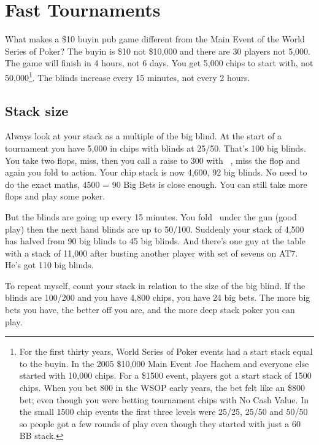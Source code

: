 \chapter{Fast Tournaments}


What makes a \$10 buyin pub game different from the Main Event of
the World Series of Poker? The buyin is \$10 not \$10,000 and there are 30
players not 5,000. The game will finish in 4 hours, not 6 days. You get
5,000 chips to start with, not 50,000\footnote{For the first thirty
years, World Series of Poker events had a start stack equal to the
buyin. In the 2005 \$10,000 Main Event Joe Hachem and everyone else
started with 10,000 chips. For a \$1500 event, players got a start
stack of 1500 chips. When you bet 800 in the WSOP early years, the bet
felt like an \$800 bet; even though you were betting tournament chips
with No Cash Value. In the small 1500 chip events the first three
levels were 25/25, 25/50 and 50/50 so people got a few rounds of play
even though they started with just a 60 BB stack.}. The blinds
increase every 15 minutes, not every 2 hours.

\section{Stack size}

Always look at your stack as a multiple of the big blind.
At the start of a tournament you have 5,000 in chips with blinds
at 25/50. That's 100 big blinds. You take two flops, miss, then you
call a raise to 300 with \sixs\sixc\ , miss the flop and again you
fold to action. Your chip stack is now 4,600, 92 big blinds. No need
to do the exact maths, 4500 = 90 Big Bets is close enough. You can
still take more flops and play some poker.

But the blinds are going up every 15 minutes. You fold \Ah\eigc\ under
the gun (good play) then the next hand blinds are up to 50/100.
Suddenly your stack of 4,500 has halved from 90 big blinds to 45
big blinds. And there's one guy at the table with a stack of 11,000 after
busting another player with set of sevens on AT7. He's got 110 big
blinds.

To repeat myself, count your stack in relation to the size of
the big blind. If the blinds are 100/200 and you have 4,800 chips, you
have 24 big bets. The more big bets you have, the better off you are,
and the more deep stack poker you can play.

